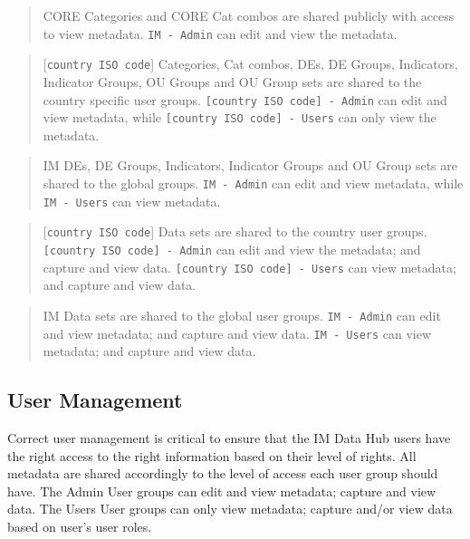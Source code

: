 \documentclass[]{book}
\begin{document}
\begin{quote}
CORE Categories and CORE Cat combos are shared publicly with access to view metadata. \texttt{IM\ -\ Admin} can edit and view the metadata.
\end{quote}

\begin{quote}
{[}\texttt{country\ ISO\ code}{]} Categories, Cat combos, DEs, DE Groups, Indicators, Indicator Groups, OU Groups and OU Group sets are shared to the country specific user groups. \texttt{{[}country\ ISO\ code{]}\ -\ Admin} can edit and view metadata, while \texttt{{[}country\ ISO\ code{]}\ -\ Users} can only view the metadata.
\end{quote}

\begin{quote}
IM DEs, DE Groups, Indicators, Indicator Groups and OU Group sets are shared to the global groups. \texttt{IM\ -\ Admin} can edit and view metadata, while \texttt{IM\ -\ Users} can view metadata.
\end{quote}

\begin{quote}
{[}\texttt{country\ ISO\ code}{]} Data sets are shared to the country user groups. \texttt{{[}country\ ISO\ code{]}\ -\ Admin} can edit and view the metadata; and capture and view data. \texttt{{[}country\ ISO\ code{]}\ -\ Users} can view metadata; and capture and view data.
\end{quote}

\begin{quote}
IM Data sets are shared to the global user groups. \texttt{IM\ -\ Admin} can edit and view metadata; and capture and view data.
\texttt{IM\ -\ Users} can view metadata; and capture and view data.
\end{quote}

\hypertarget{user-management}{%
\subsection{User Management}\label{user-management}}

Correct user management is critical to ensure that the IM Data Hub users have the right access to the right information based on their level of rights. All metadata are shared accordingly to the level of access each user group should have. The Admin User groups can edit and view metadata; capture and view data. The Users User groups can only view metadata; capture and/or view data based on user's user roles.
\end{document}
